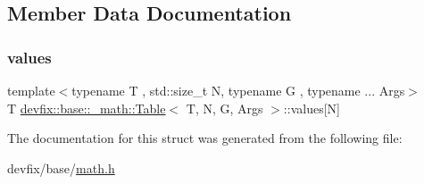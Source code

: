\subsection{Member Data Documentation}
\mbox{\label{structdevfix_1_1base_1_1__math_1_1Table_a3352fdb7ab931816a7d131b643099c97}} 
\subsubsection{\texorpdfstring{values}{values}}
{\footnotesize\ttfamily template$<$typename T , std\+::size\+\_\+t N, typename G , typename ... Args$>$ \\
T \hyperlink{structdevfix_1_1base_1_1__math_1_1Table}{devfix\+::base\+::\+\_\+math\+::\+Table}$<$ T, N, G, Args $>$\+::values\mbox{[}N\mbox{]}}



The documentation for this struct was generated from the following file\+:\begin{DoxyCompactItemize}
\item 
devfix/base/\hyperlink{math_8h}{math.\+h}\end{DoxyCompactItemize}
